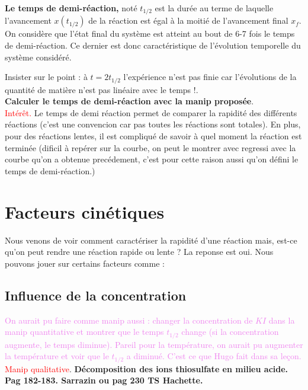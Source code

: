 \documentclass{article}
\begin{document}
\textbf{Le temps de demi-réaction,} noté $t_{1/2}$ est la durée au terme de laquelle l'avancement $x(t_{1/2})$ de la réaction est égal à la moitié de l'avancement final $x_f$. On considère que l'état final du système est atteint au bout de 6-7 fois le temps de demi-réaction. Ce dernier est donc caractéristique de l'évolution temporelle du système considéré.\medskip

Insister sur le point : à $t=2t_{1/2}$ l'expérience n'est pas finie car l'évolutions de la quantité de matière n'est pas linéaire avec le temps !.\\

\textbf{Calculer le temps de demi-réaction avec la manip proposée}.\\

\textcolor{red}{Intérêt.} Le temps de demi réaction permet de comparer la rapidité des différents réactions (c'est une convencion car pas toutes les réactions sont totales). En plus, pour des réactions lentes, il est compliqué de savoir à quel moment la réaction est terminée (dificil à repérer sur la courbe, on peut le montrer avec regressi avec la courbe qu'on a obtenue precédement, c'est pour cette raison aussi qu'on défini le temps de demi-réaction.)  

\section{Facteurs cinétiques}

Nous venons de voir comment caractériser la rapidité d'une réaction mais, est-ce qu'on peut rendre une réaction rapide ou lente ? La reponse est oui. Nous pouvons jouer sur certains facteurs comme :

\subsection{Influence de la concentration}

\textcolor{violet}{On aurait pu faire comme manip aussi : changer la concentration de $KI$ dans la manip quantitative et montrer que le temps $t_{1/2}$ change (si la concentration augmente, le temps diminue). Pareil pour la température, on aurait pu augmenter la température et voir que le $t_{1/2}$ a diminué. C'est ce que Hugo fait dans sa leçon.}\\

\textcolor{red}{Manip qualitative}. \textbf{Décomposition des ions thiosulfate en milieu acide. Pag 182-183. Sarrazin ou pag 230 TS Hachette.}\\
\end{document}

